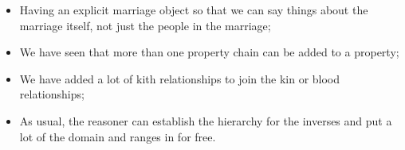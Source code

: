 \begin{itemize}
\item Having an explicit marriage object so that we can say things about the marriage itself, not just the people in the marriage;
\item We have seen that more than one property chain can be added to a property;
\item We have added a lot of kith relationships to join the kin or blood relationships;
\item As usual, the reasoner can establish the hierarchy for the inverses and put a lot of the domain and ranges in for free.
\end{itemize}



